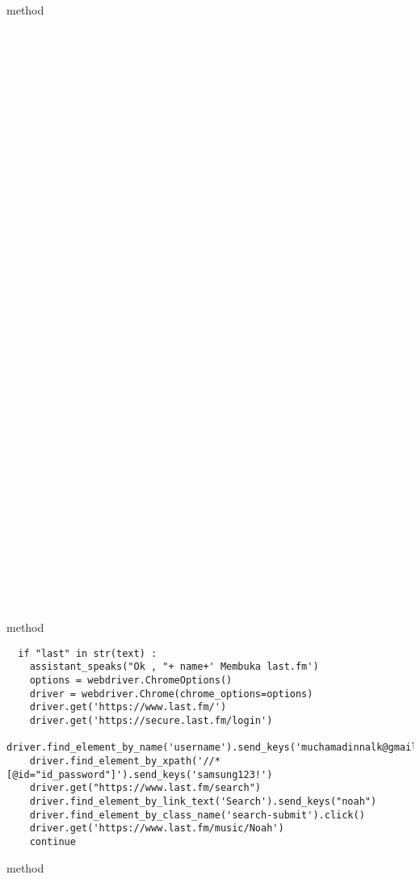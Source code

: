  method 
\\
\\
\\
\\
\\
\\
\\
\\
\\
\\
\\
\\
\\
\\
\\
\\
\\
\\
\\
\\
\\
\\
\\
\\
\\
\\
\\
\\
\\
\\
\\
\\
\\
\\
\\
\\
\\
\\
\\
 method 
\begin{lstlisting}
  if "last" in str(text) :
    assistant_speaks("Ok , "+ name+' Membuka last.fm')
    options = webdriver.ChromeOptions()
    driver = webdriver.Chrome(chrome_options=options)
    driver.get('https://www.last.fm/')
    driver.get('https://secure.last.fm/login')
    driver.find_element_by_name('username').send_keys('muchamadinnalk@gmail.com')
    driver.find_element_by_xpath('//*[@id="id_password"]').send_keys('samsung123!')
    driver.get("https://www.last.fm/search")
    driver.find_element_by_link_text('Search').send_keys("noah")
    driver.find_element_by_class_name('search-submit').click()
    driver.get('https://www.last.fm/music/Noah')
    continue
\end{lstlisting}
 method 
\\
\\
\\

